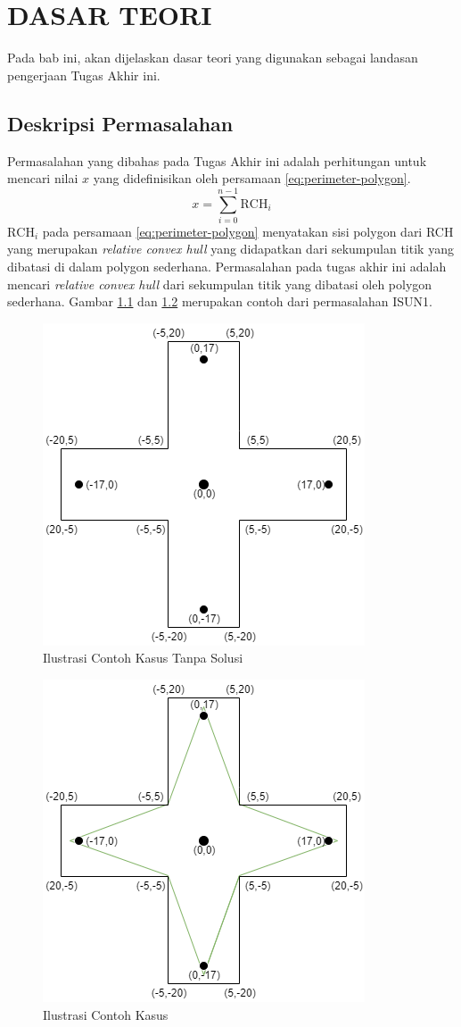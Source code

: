 \chapter {DASAR TEORI}

Pada bab ini, akan dijelaskan dasar teori yang digunakan sebagai landasan pengerjaan Tugas Akhir ini.

\section{Deskripsi Permasalahan}
Permasalahan yang dibahas pada Tugas Akhir ini adalah perhitungan untuk mencari nilai $x$ yang didefinisikan oleh persamaan \eqref{eq:perimeter-polygon}.
\begin{equation}
    \label{eq:perimeter-polygon}
    x=\sum_{i=0}^{n-1} \text{RCH}_i
\end{equation}
$\text{RCH}_i$ pada persamaan \eqref{eq:perimeter-polygon} menyatakan sisi polygon dari RCH yang merupakan \textit{relative convex hull} yang didapatkan dari sekumpulan titik yang dibatasi di dalam polygon sederhana\cite{isun1}. Permasalahan pada tugas akhir ini adalah mencari \textit{relative convex hull} dari sekumpulan titik yang dibatasi oleh polygon sederhana. Gambar \ref{fig:ilustrasi-contoh-kasus-tanpa-solusi} dan \ref{fig:ilustrasi-contoh-kasus} merupakan contoh dari permasalahan ISUN1.
\begin{figure}[!h]
	\Centering
	\includegraphics [width=0.5\columnwidth]{bab2/img/contoh-kasus-tanpa-solusi}
	\caption {Ilustrasi Contoh Kasus Tanpa Solusi}
	\label {fig:ilustrasi-contoh-kasus-tanpa-solusi}
\end{figure}
\begin{figure}[!h]
	\Centering
	\includegraphics [width=0.5\columnwidth]{bab2/img/contoh-kasus}
	\caption {Ilustrasi Contoh Kasus}
	\label {fig:ilustrasi-contoh-kasus}
\end{figure}

